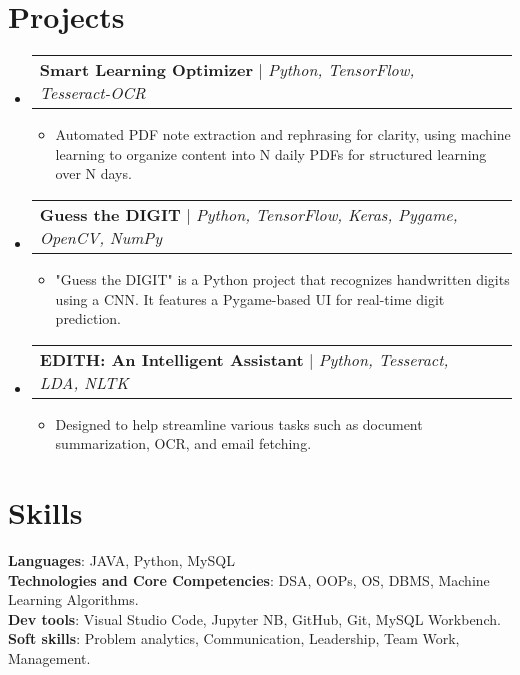 \documentclass[a4paper,11pt]{article}
\makeatletter
\newcommand{\resumeItem}[1]{
    \item\small{
        {#1 \vspace{-2pt}}
    }
}
\newcommand{\resumeProjectHeading}[2]{
        \item
        \begin{tabular*}{0.97\textwidth}{l@{\extracolsep{\fill}}r}
            \small#1 & #2 \\
        \end{tabular*}\vspace{-10pt} %
}
\newcommand{\resumeSubHeadingListStart}{\begin{itemize}[leftmargin=0.15in, label={}]}
\newcommand{\resumeSubHeadingListEnd}{\end{itemize}}
\newcommand{\resumeItemListStart}{\begin{itemize}}
\newcommand{\resumeItemListEnd}{\end{itemize}\vspace{-5pt}}
\makeatother
\begin{document}
\section{Projects}
    \resumeSubHeadingListStart
        \resumeProjectHeading
            {\textbf{Smart Learning Optimizer} \href{https://github.com/sidd1092/Smart-Learning-Optimizer}{\faGithub} $|$ \emph{Python, TensorFlow, Tesseract-OCR}}{}
            \resumeItemListStart
                \resumeItem{Automated PDF note extraction and rephrasing for clarity, using machine learning to organize content into N daily PDFs for structured learning over N days.}
            \resumeItemListEnd
        \resumeProjectHeading
            {\textbf{Guess the DIGIT} \href{https://github.com/sidd1092/Guess_the_Digit}{\faGithub} $|$ \emph{Python, TensorFlow, Keras, Pygame, OpenCV, NumPy}}{}
            \resumeItemListStart
                \resumeItem{"Guess the DIGIT" is a Python project that recognizes handwritten digits using a CNN. It features a Pygame-based UI for real-time digit prediction.}
            \resumeItemListEnd
        \resumeProjectHeading
            {\textbf{EDITH: An Intelligent Assistant} \href{https://github.com/sidd1092/EDITH}{\faGithub} $|$ \emph{Python, Tesseract, LDA, NLTK}}{}
            \resumeItemListStart
                \resumeItem{Designed to help streamline various tasks such as document summarization, OCR, and email fetching.}
            \resumeItemListEnd
        
    \resumeSubHeadingListEnd

\section{Skills}
\begin{itemize}[leftmargin=0.15in, label={}]
        \small{\item{
         \textbf{Languages}{: JAVA, Python, MySQL} \\
         \textbf{Technologies and Core Competencies}{: DSA, OOPs, OS, DBMS, Machine Learning Algorithms.} \\
         \textbf{Dev tools}{: Visual Studio Code, Jupyter NB, GitHub, Git, MySQL Workbench.} \\
         \textbf{Soft skills}{: Problem analytics, Communication, Leadership, Team Work, Management.}
        }}
\end{itemize}

\end{document}
